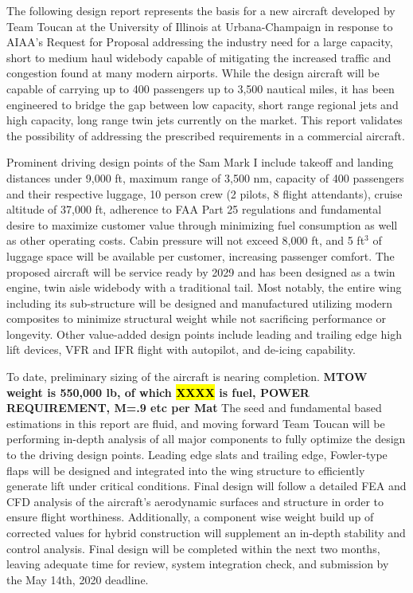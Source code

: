 The following design report represents the basis for a new aircraft developed by Team Toucan at the University of Illinois at Urbana-Champaign in response to AIAA's Request for Proposal\cite{RFP} addressing the industry need for a large capacity, short to medium haul widebody capable of mitigating the increased traffic and congestion found at many modern airports.  While the design aircraft will be capable of carrying up to 400 passengers up to 3,500 nautical miles, it has been engineered to bridge the gap between low capacity, short range regional jets and high capacity, long range twin jets currently on the market.  This report validates the possibility of addressing the prescribed requirements in a commercial aircraft.

Prominent driving design points of the Sam Mark I include takeoff and landing distances under 9,000 ft, maximum range of 3,500 nm, capacity of 400 passengers and their respective luggage, 10 person crew (2 pilots, 8 flight attendants), cruise altitude of 37,000 ft, adherence to FAA Part 25 regulations and fundamental desire to maximize customer value through minimizing fuel consumption as well as other operating costs.  Cabin pressure will not exceed 8,000 ft, and 5 ft$^3$ of luggage space will be available per customer, increasing passenger comfort.  The proposed aircraft will be service ready by 2029 and has been designed as a twin engine, twin aisle widebody with a traditional tail.  Most notably, the entire wing including its sub-structure will be designed and manufactured utilizing modern composites to minimize structural weight while not sacrificing performance or longevity.  Other value-added design points include leading and trailing edge high lift devices, VFR and IFR flight with autopilot, and de-icing capability.

To date, preliminary sizing of the aircraft is nearing completion.  \textbf{MTOW weight is 550,000 lb, of which \hl{XXXX} is fuel, POWER REQUIREMENT, M=.9 etc per Mat} The seed and fundamental based estimations in this report are fluid, and moving forward Team Toucan will be performing in-depth analysis of all major components to fully optimize the design to the driving design points.  Leading edge slats and trailing edge, Fowler-type flaps will be designed and integrated into the wing structure to efficiently generate lift under critical conditions.  Final design will follow a detailed FEA and CFD analysis of the aircraft's aerodynamic surfaces and structure in order to ensure flight worthiness.  Additionally, a component wise weight build up of corrected values for hybrid construction will supplement an in-depth stability and control analysis.  Final design will be completed within the next two months, leaving adequate time for review, system integration check, and submission by the May 14th, 2020 deadline.

